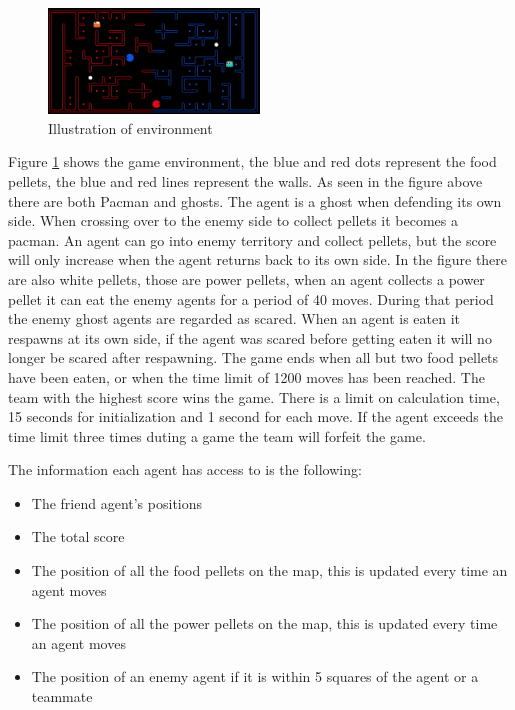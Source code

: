 \documentclass[a4paper,12pt]{article}
\begin{document}
\begin{figure}[!htbp]
  \centering
  \includegraphics[width=0.5\textwidth]{./figuresA4/pacman_illustration.png}
  \caption{Illustration of environment}
  \label{fig:drag_force}
\end{figure}

Figure \ref{fig:drag_force} shows the game environment, the blue and red dots represent the food pellets, the blue and red lines represent the walls. 
As seen in the figure above there are both Pacman and ghosts. The agent is a ghost when defending its own side. When crossing over to the enemy side to collect pellets it becomes a pacman.
An agent can go into enemy territory and collect pellets, but the score will only increase when the agent returns back to its own side. In the figure there are also white pellets, 
those are power pellets, when an agent collects a power pellet it can eat the enemy agents for a period of 40 moves. During that period the enemy ghost agents are regarded as scared.
When an agent is eaten it respawns at its own side, if the agent was scared before getting eaten it will no longer be scared after respawning.
The game ends when all but two food pellets have been eaten, or when the time limit of 1200 moves has been reached. The team with the highest score wins the game.
There is a limit on calculation time, 15 seconds for initialization and 1 second for each move. If the agent exceeds the time limit three times duting a game the team will forfeit the game.

The information each agent has access to is the following:
\begin{itemize}
  \item The friend agent's positions
  \item The total score
  \item The position of all the food pellets on the map, this is updated every time an agent moves
  \item The position of all the power pellets on the map, this is updated every time an agent moves
  \item The position of an enemy agent if it is within 5 squares of the agent or a teammate
\end{itemize}
\end{document}
